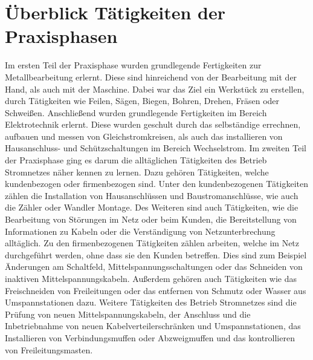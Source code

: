 \chapter*{Überblick Tätigkeiten der Praxisphasen} %

Im ersten Teil der Praxisphase wurden grundlegende Fertigkeiten zur Metallbearbeitung erlernt. Diese sind hinreichend von der Bearbeitung mit der Hand, als auch mit der Maschine. Dabei war das Ziel ein Werkstück zu erstellen, durch Tätigkeiten wie Feilen, Sägen, Biegen, Bohren, Drehen, Fräsen oder Schweißen. Anschließend wurden grundlegende Fertigkeiten im Bereich Elektrotechnik erlernt. Diese wurden geschult durch das selbständige errechnen, aufbauen und messen von Gleichstromkreisen, als auch das installieren von Hausanschluss- und Schützschaltungen im Bereich Wechselstrom.
Im zweiten Teil der Praxisphase ging es darum die alltäglichen Tätigkeiten des Betrieb Stromnetzes näher kennen zu lernen. Dazu gehören Tätigkeiten, welche kundenbezogen oder firmenbezogen sind. Unter den kundenbezogenen Tätigkeiten zählen die Installation von Hausanschlüssen und Baustromanschlüsse, wie auch die Zähler oder Wandler Montage. Des Weiteren sind auch Tätigkeiten, wie die Bearbeitung von Störungen im Netz oder beim Kunden, die Bereitstellung von Informationen zu Kabeln oder die Verständigung von Netzunterbrechung alltäglich. Zu den firmenbezogenen Tätigkeiten zählen arbeiten, welche im Netz durchgeführt werden, ohne dass sie den Kunden betreffen. Dies sind zum Beispiel Änderungen am Schaltfeld, Mittelspannungsschaltungen oder das Schneiden von inaktiven Mittelspannungskabeln. Außerdem gehören auch Tätigkeiten wie das Freischneiden von Freileitungen oder das entfernen von Schmutz oder Wasser aus Umspannstationen dazu. Weitere Tätigkeiten des Betrieb Stromnetzes sind die Prüfung von neuen Mittelspannungskabeln, der Anschluss und die Inbetriebnahme von neuen Kabelverteilerschränken und Umspannstationen, das Installieren von Verbindungsmuffen oder Abzweigmuffen und das kontrollieren von Freileitungsmasten.


\cleardoublepage
